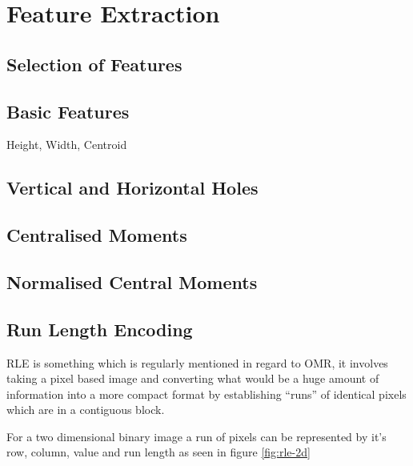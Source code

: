\section{Feature Extraction}

\subsection{Selection of Features}

\subsection{Basic Features}
Height, Width, Centroid

\subsection{Vertical and Horizontal Holes}

\subsection{Centralised Moments}

\subsection{Normalised Central Moments}

\subsection{Run Length Encoding}
\label{sec:tb-rle}

\acrfull{RLE} is something which is regularly mentioned in regard to OMR, it involves taking a pixel based image and converting what would be a huge amount of information into a more compact format by establishing ``runs'' of identical pixels which are in a contiguous block.

For a two dimensional binary image a run of pixels can be represented by it's row, column, value and run length \parencite[p. 27-28]{burger2009principles} as seen in figure \ref{fig:rle-2d}

